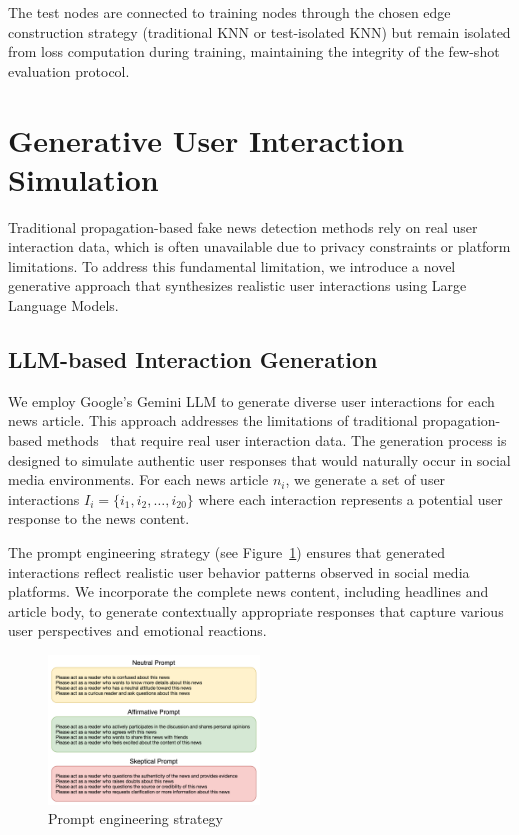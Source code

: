 The test nodes are connected to training nodes through the chosen edge construction strategy (traditional KNN or test-isolated KNN) but remain isolated from loss computation during training, maintaining the integrity of the few-shot evaluation protocol.

\section{Generative User Interaction Simulation}

Traditional propagation-based fake news detection methods rely on real user interaction data, which is often unavailable due to privacy constraints or platform limitations. To address this fundamental limitation, we introduce a novel generative approach that synthesizes realistic user interactions using Large Language Models.

\subsection{LLM-based Interaction Generation}

We employ Google's Gemini LLM to generate diverse user interactions for each news article. This approach addresses the limitations of traditional propagation-based methods~\cite{ma2016detecting, shu2017fake} that require real user interaction data. The generation process is designed to simulate authentic user responses that would naturally occur in social media environments. For each news article $n_i$, we generate a set of user interactions $I_i = \{i_1, i_2, \ldots, i_{20}\}$ where each interaction represents a potential user response to the news content.

The prompt engineering strategy (see Figure~\ref{fig:prompt}) ensures that generated interactions reflect realistic user behavior patterns observed in social media platforms. We incorporate the complete news content, including headlines and article body, to generate contextually appropriate responses that capture various user perspectives and emotional reactions.

\begin{figure}[h]
    \centering
    \includegraphics[width=0.5\textwidth]{context/methodology/fig/prompt.png}
    \caption{Prompt engineering strategy}
    \label{fig:prompt}
\end{figure}

